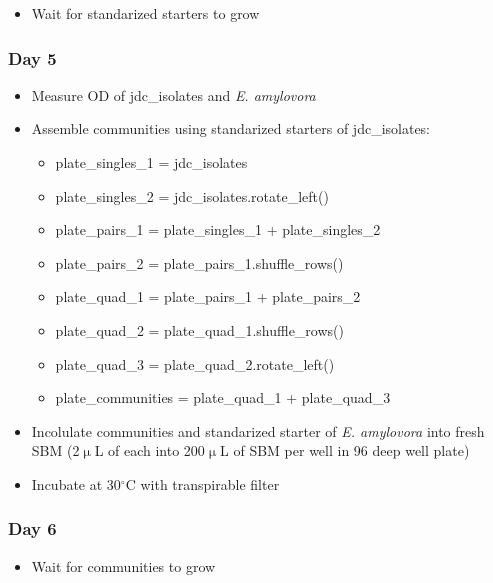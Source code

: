 \documentclass[a4paper,10pt]{article}
\begin{document}
\begin{itemize}[label=\Square]

\item Wait for standarized starters to grow

\end{itemize}

\subsubsection*{Day 5}

\begin{itemize}[label=\Square]

\item Measure OD of jdc\_isolates and \textit{E. amylovora}
\item Assemble communities using standarized starters of jdc\_isolates:
\begin{itemize}[label=\Square]
\item plate\_singles\_1 = jdc\_isolates
\item plate\_singles\_2 = jdc\_isolates.rotate\_left()
\item plate\_pairs\_1 = plate\_singles\_1 + plate\_singles\_2
\item plate\_pairs\_2 = plate\_pairs\_1.shuffle\_rows()
\item plate\_quad\_1 = plate\_pairs\_1 + plate\_pairs\_2
\item plate\_quad\_2 = plate\_quad\_1.shuffle\_rows()
\item plate\_quad\_3 = plate\_quad\_2.rotate\_left()
\item plate\_communities = plate\_quad\_1 + plate\_quad\_3
\end{itemize}
\item Incolulate communities and standarized starter of \textit{E. amylovora}
into fresh SBM (2$\upmu$L of each into 200$\upmu$L of SBM per well in 96 deep
well plate)
\item Incubate at 30$^\circ$C with transpirable filter

\end{itemize}

\subsubsection*{Day 6}

\begin{itemize}[label=\Square]

\item Wait for communities to grow

\end{itemize}
\end{document}
